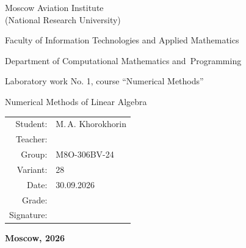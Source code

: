 \begin{titlepage}
\begin{center}
\bfseries

{\Large Moscow Aviation Institute\\ (National Research University)

}

\vspace{48pt}

{\large Faculty of Information Technologies and Applied Mathematics
}

\vspace{36pt}

{\large Department of Computational Mathematics and~Programming

}

\vspace{48pt}

Laboratory work No. 1, course \enquote{Numerical Methods}

\vspace{12pt}

Numerical Methods of Linear Algebra

\end{center}

\vspace{72pt}

\begin{flushright}
\begin{tabular}{rl}
Student: & M.\,A. Khorokhorin \\
Teacher: & \\
Group: & M8O-306BV-24 \\
Variant: & 28 \\
Date: & 30.09.2026 \\
Grade: & \\
Signature: & \\
\end{tabular}
\end{flushright}

\vfill

\begin{center}
\bfseries
Moscow, 2026
\end{center}
\end{titlepage}

\pagebreak
